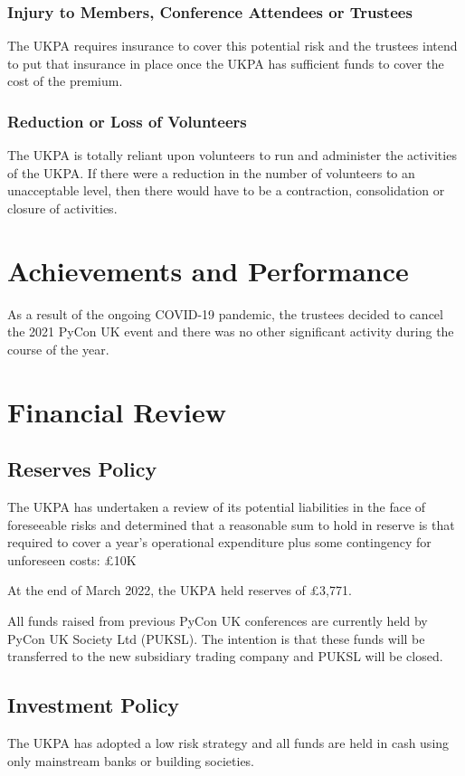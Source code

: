 \documentclass[11pt, final]{article}
\begin{document}
\subsubsection{Injury to Members, Conference Attendees or Trustees}
The UKPA requires insurance to cover this potential risk and the trustees intend to put that insurance in place once the UKPA has sufficient funds to cover the cost of the premium.

\subsubsection{Reduction or Loss of Volunteers}
The UKPA is totally reliant upon volunteers to run and administer the activities of the UKPA. If there were a reduction in the number of volunteers to an unacceptable level, then there would have to be a contraction, consolidation or closure of activities.

\section{Achievements and Performance}
As a result of the ongoing COVID-19 pandemic, the trustees decided to cancel the 2021 PyCon UK event and there was no other significant activity during the course of the year.
\section{Financial Review}

\subsection{Reserves Policy}
The UKPA has undertaken a review of its potential liabilities in the face of foreseeable risks and determined that a reasonable sum to hold in reserve is that required to cover a year's operational expenditure plus some contingency for unforeseen costs: \pounds10K

At the end of March 2022, the UKPA held reserves of \pounds 3,771.

All funds raised from previous PyCon UK conferences are currently held by PyCon UK Society Ltd (PUKSL). The intention is that these funds will be transferred to the new subsidiary trading company and PUKSL will be closed.

\subsection{Investment Policy}
The UKPA has adopted a low risk strategy and all funds are held in cash using only mainstream banks or building societies.
\end{document}
